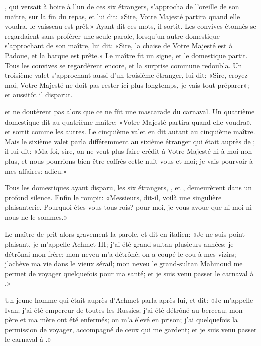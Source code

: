 , qui versait à boire à l’un de ces six étrangers, s’approcha de
l’oreille de son maître, sur la fin du repas, et lui dit: «Sire, Votre
Majesté partira quand elle voudra, le vaisseau est prêt.» Ayant dit ces
mots, il sortit. Les convives étonnés se regardaient sans proférer une
seule parole, lorsqu’un autre domestique s’approchant de son maître,
lui dit: «Sire, la chaise de Votre Majesté est à Padoue, et la barque
est prête.» Le maître fit un signe, et le domestique partit. Tous les
convives se regardèrent encore, et la surprise commune redoubla. Un
troisième valet s’approchant aussi d’un troisième étranger, lui dit:
«Sire, croyez-moi, Votre Majesté ne doit pas rester ici plus longtemps,
je vais tout préparer»; et aussitôt il disparut.

 et  ne doutèrent pas alors que ce ne fût une mascarade du
carnaval. Un quatrième domestique dit au quatrième maître: «Votre
Majesté partira quand elle voudra», et sortit comme les autres. Le
cinquième valet en dit autant au cinquième maître. Mais le sixième
valet parla différemment au sixième étranger qui était auprès de
; il lui dit: «Ma foi, sire, on ne veut plus faire crédit à Votre
Majesté ni à moi non plus, et nous pourrions bien être coffrés cette
nuit vous et moi; je vais pourvoir à mes affaires: adieu.»

Tous les domestiques ayant disparu, les six étrangers, , et
, demeurèrent dans un profond silence. Enfin  le rompit:
«Messieurs, dit-il, voilà une singulière plaisanterie. Pourquoi
êtes-vous tous rois? pour moi, je vous avoue que ni moi ni  nous
ne le sommes.»

Le maître de  prit alors gravement la parole, et dit en italien:
«Je ne suis point plaisant, je m’appelle Achmet III; j’ai été
grand-sultan plusieurs années; je détrônai mon frère; mon neveu m’a
détrôné; on a coupé le cou à mes vizirs; j’achève ma vie dans le vieux
sérail; mon neveu le grand-sultan Mahmoud me permet de voyager
quelquefois pour ma santé; et je suis venu passer le carnaval à  .»

Un jeune homme qui était auprès d’Achmet parla après lui, et dit: «Je
m’appelle Ivan; j’ai été empereur de toutes les Russies; j’ai été
détrôné au berceau; mon père et ma mère ont été enfermés; on m’a élevé
en prison; j’ai quelquefois la permission de voyager, accompagné de
ceux qui me gardent; et je suis venu passer le carnaval à  .»



